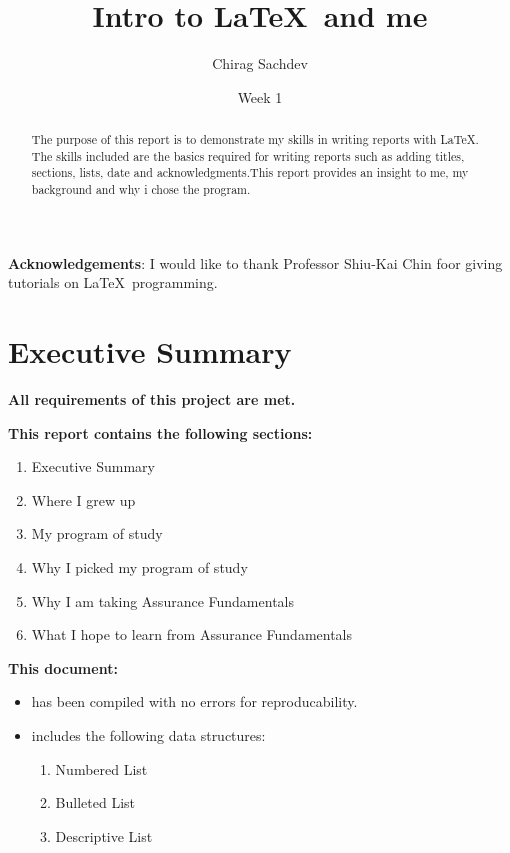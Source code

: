 \documentclass[11]{article}
\begin{document}
\title{Intro to \LaTeX\ and me} 
\author{Chirag Sachdev}
\date{Week 1}
\maketitle

\begin{abstract}
  The purpose of this report is to demonstrate my skills in writing reports with \LaTeX . The skills included are the basics required for writing reports such as adding titles, sections, lists, date and acknowledgments.This report provides an insight to me, my background and why i chose the program.
\end{abstract}

\textbf{Acknowledgements}: I would like to thank Professor Shiu-Kai Chin foor giving tutorials on \LaTeX\ programming.

\section{Executive Summary}
\begin{description}

\item \textbf{All requirements of this project are met.}

\item \textbf{This report contains the following sections:}
\begin{enumerate}
	\item Executive Summary
	\item Where I grew up
	\item My program of study
	\item Why I picked my program of study
	\item Why I am taking Assurance Fundamentals
	\item What I hope to learn from Assurance Fundamentals
\end{enumerate}

\item \textbf{This document: } 
\begin{itemize}
	\item has been compiled with no errors for reproducability.
	\item includes the following data structures:
	\begin{enumerate}
		\item Numbered List
		\item Bulleted List
		\item Descriptive List
	\end{enumerate}
\end{itemize}
\end{description}
\end{document}

